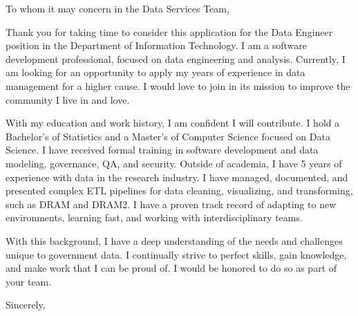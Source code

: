\documentclass[11pt,twoside]{letter}
\begin{document}
\begin{letter}{}





\opening
{To whom it may concern in \newcommand{\cn}{the Data Services Team}\cn{},}

\setlength{\parindent}{15pt} %

Thank you for taking time to consider this application for the
Data Engineer position
in the Department of Information Technology.
I am a software development professional, focused on data engineering and analysis.
%
Currently, I am looking for an opportunity to apply my years of experience in data
management for a higher cause. I would love to join \cn{} in its mission to improve the community I live in and love.
%

With my education and work history, I am confident I will contribute.
I hold a Bachelor's of Statistics and a Master's of
Computer Science focused on Data Science.
I have received formal training in software development and data modeling, governance,
QA, and security.
Outside of academia, I have 5 years of experience with data in the research industry.
I have managed, documented, and presented complex ETL pipelines for data cleaning,
visualizing, and transforming, such as DRAM and DRAM2.
I have a proven track record of adapting to new environments, learning fast, and
working with interdisciplinary teams.


With this background, I have a deep understanding of the needs and challenges unique to
government data.
I continually strive to perfect skills, gain knowledge, and make work that I can be proud of.
I would be honored to do so as part of your team.


\closing{Sincerely,}


\end{letter}
\end{document}
